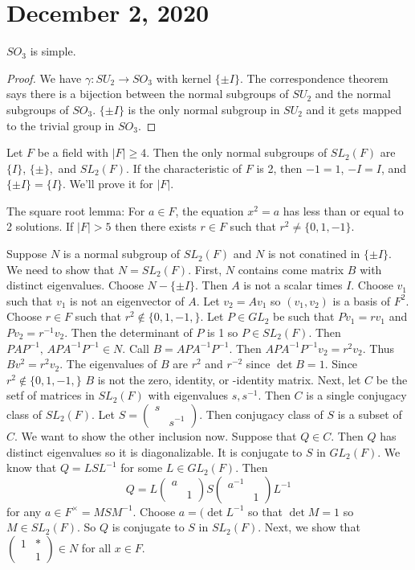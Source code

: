 \documentclass{article}
\newcommand{\ra}[1][]{\xrightarrow{#1}}
\begin{document}
\section{December 2, 2020}
\begin{corollary}
$SO_3$ is simple.
\end{corollary}
\begin{proof}
We have $\gamma: SU_2\ra SO_3$ with kernel $\{\pm I\}$. The correspondence theorem says there is a bijection between the normal subgroups of $SU_2$ and the normal subgroups of $SO_3$. $\{\pm I\}$ is the only normal subgroup in $SU_2$ and it gets mapped to the trivial group in $SO_3$.
\end{proof}
\begin{theorem}
Let $F$ be a field with $|F|\geq 4$. Then the only normal subgroups of $SL_2(F)$ are $\{I\}$, $\{\pm\},$ and $SL_2(F)$. If the characteristic of $F$ is 2, then $-1=1$, $-I=I$, and $\{\pm I\}=\{I\}$. We'll prove it for $|F|$.

The square root lemma: For $a\in F$, the equation $x^2=a$ has less than or equal to 2 solutions. If $|F|>5$ then there exists $r\in F$ such that $r^2\neq \{0,1,-1\}$.

Suppose $N$ is a normal subgroup of $SL_2(F)$ and $N$ is not conatined in $\{\pm I\}$. We need to show that $N=SL_2(F)$. First, $N$ contains come matrix $B$ with distinct eigenvalues. Choose $N-\{\pm I\}$. Then $A$ is not a scalar times $I$. Choose $v_1$ such that $v_1$ is not an eigenvector of $A$. Let $v_2=Av_1$ so $(v_1,v_2)$ is a basis of $F^2$. Choose $r\in F$ such that $r^2\notin\{0,1,-1,\}$. Let $P\in GL_2$ be such that $Pv_1=rv_1$ and $Pv_2=r^{-1}v_2$. Then the determinant of $P$ is 1 so $P\in SL_2(F)$. Then $PAP^{-1},\, APA^{-1}P^{-1}\in N$. Call $B=APA^{-1}P^{-1}$. Then $APA^{-1}P^{-1}v_2=r^2v_2$. Thus $Bv^2=r^2v_2$. The eigenvalues of $B$ are $r^2$ and $r^{-2}$ since $\det B=1$. Since $r^2\notin\{0,1,-1,\}$ $B$ is not the zero, identity, or -identity matrix. Next, let $C$ be the setf of matrices in $SL_2(F)$ with eigenvalues $s,s^{-1}$. Then $C$ is a single conjugacy class of $SL_2(F)$. Let $S=\begin{pmatrix} s&\\&s^{-1}\end{pmatrix}$. Then conjugacy class of $S$ is a subset of $C$. We want to show the other inclusion now. Suppose that $Q\in C$. Then $Q$ has distinct eigenvalues so it is diagonalizable. It is conjugate to $S$ in $GL_2(F)$. We know that $Q=LSL^{-1}$ for some $L\in GL_2(F)$. Then
$$Q=L\begin{pmatrix}
a&\\&1
\end{pmatrix}S\begin{pmatrix}
a^{-1}&\\&1
\end{pmatrix}L^{-1}$$ for any $a\in F^\times=MSM^{-1}$. Choose $a=(\det L^{-1}$ so that $\det M=1$ so $M\in SL_2(F)$. So $Q$ is conjugate to $S$ in $SL_2(F)$. Next, we show that $\begin{pmatrix}
1&*\\&1
\end{pmatrix}\in N$ for all $x\in F$.
\end{theorem}
\end{document}
